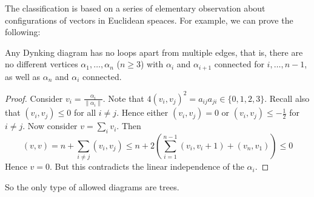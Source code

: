 \documentclass[11pt, english]{article}
\begin{document}
The classification is based on a series of elementary observation about configurations of vectors in Euclidean speaces. For example, we can prove the following:

\begin{lemma}
Any Dynking diagram has no loops apart from multiple edges, that is, there are no different vertices $\alpha_1, \ldots, \alpha_n$ ($n \geq 3$) with $\alpha_i$ and $\alpha_{i+1}$ connected for $i,\ldots,n-1$, as well as $\alpha_n$ and $\alpha_i$ connected.
\end{lemma}
\begin{proof}
Consider $v_i = \frac{\alpha_i}{\| \alpha_i \|}$. Note that $4(v_i,v_j)^2 = a_{ij}a_{ji} \in \{ 0,1,2,3 \}$. Recall also that $(v_i,v_j) \leq 0$ for all $i \neq j$. Hence either $(v_i,v_j)=0$ or $(v_i,v_j) \leq -\frac 12$ for $i \neq j$. Now consider $v = \sum_i v_i$. Then
$$
(v,v) = n + \sum_{i \neq j} (v_i,v_j) \leq n+ 2 \left( \sum_{i=1}^{n-1} (v_i,v_i+1) + (v_n,v_1) \right)  \leq 0
$$
Hence $v=0$. But this contradicts the linear independence of the $\alpha_i$.
\end{proof}

So the only type of allowed diagrams are trees. 
\end{document}
